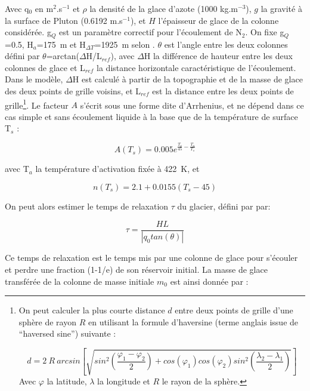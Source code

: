 Avec q$_0$ en m$^2$.s$^{-1}$ et $\rho$ la densité de la glace d’azote (1000 kg.m$^{-3}$), $g$ la gravité à la surface de Pluton (0.6192 m.s$^{-1}$), et $H$ l’épaisseur de glace de la colonne considérée. g$_Q$ est un paramètre correctif pour l’écoulement de N$_2$. On fixe g$_Q$=0.5, H$_a$=175~m et H$_{\Delta T}$=1925~m selon \citet{Umur:17}. $\theta$ est l’angle entre les deux colonnes défini par $\theta$=arctan($\Delta$H/L$_{ref}$), avec $\Delta$H la différence de hauteur entre les deux colonnes de glace et L$_{ref}$ la distance horizontale caractéristique de l’écoulement. Dans le modèle, $\Delta$H est calculé à partir de la topographie et de la masse de glace des deux points de grille voisins, et L$_{ref}$ est la distance entre les deux points de grille\footnote{On peut calculer la plus courte distance $d$ entre deux points de grille d’une sphère de rayon $R$ en utilisant la formule d’haversine (terme anglais issue de ``haversed sine'') suivante :

\begin{equation}
\label{eq:haversine}
d=2~R~arcsin[\sqrt{sin^{2}(\frac{\varphi_1-\varphi_2}{2})+cos(\varphi_1)cos(\varphi_2)sin^2(\frac{\lambda_2-\lambda_1}{2})}]
\end{equation}
Avec $\varphi$ la latitude, $\lambda$ la longitude et $R$ le rayon de la sphère.
}. 
Le facteur $A$ s’écrit sous une forme dite d’Arrhenius, et ne dépend dans ce cas simple et sans écoulement liquide à la base que de la température de surface T$_s$ :

\begin{equation}
A(T_s)=0.005 e^{\frac{T_a}{45}-\frac{T_a}{T_s}}
\end{equation}

avec T$_a$ la température d’activation fixée à 422~K, et

\begin{equation}
n(T_s)=2.1+0.0155(T_s-45)
\end{equation}

On peut alors estimer le temps de relaxation $\tau$ du glacier, défini par \citet{Umur:17} par: 

\begin{equation}
\tau = \frac{H L}{\left | q_{0} tan(\theta )\right |}
\end{equation}

Ce temps de relaxation est le temps mis par une colonne de glace pour s’écouler et perdre une fraction (1-1/e) de son réservoir initial. 
La masse de glace transférée de la colonne de masse initiale $m_0$ est ainsi donnée par :

